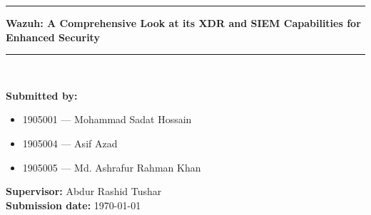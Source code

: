 \begin{titlepage}
\begin{centering}
       \noindent\rule[0.5ex]{\linewidth}{1pt} 
        \Large
        \textbf{Wazuh: A Comprehensive Look at its XDR and SIEM Capabilities for Enhanced Security}\\
        \noindent\rule[0.5ex]{\linewidth}{1pt}\\[1.5em]
    \end{centering}
    \noindent
\large
\textbf{Submitted by: }
         \begin{itemize}[leftmargin= 16pt, label={}, after=\vspace{1cm}]
             \item 1905001 --- Mohammad Sadat Hossain
             \item 1905004 --- Asif Azad
             \item 1905005 --- Md. Ashrafur Rahman Khan
        \end{itemize}
\vspace{-.5cm}
\textbf{Supervisor: } Abdur Rashid Tushar \\[0.4em]
\textbf{Submission date: } \today

\end{titlepage}
\restoregeometry%